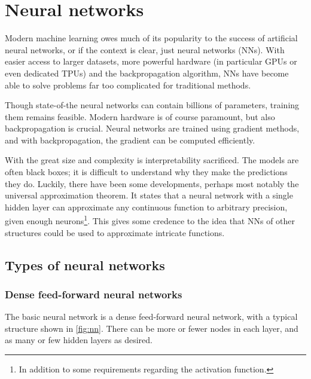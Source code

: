 \section{Neural networks}
Modern machine learning owes much of its popularity to the success of artificial neural networks, or if the context is clear, just neural networks (NNs).
With easier access to larger datasets, more powerful hardware (in particular GPUs or even dedicated TPUs) and the backpropagation algorithm, NNs have become able to solve problems far too complicated for traditional methods.

Though state-of-the neural networks can contain billions of parameters, training them remains feasible.
Modern hardware is of course paramount, but also backpropagation is crucial.
Neural networks are trained using gradient methods, and with backpropagation, the gradient can be computed efficiently.

With the great size and complexity is interpretability sacrificed.
The models are often black boxes; it is difficult to understand why they make the predictions they do.
Luckily, there have been some developments, perhaps most notably the universal approximation theorem.
It states that a neural network with a single hidden layer can approximate any continuous function to arbitrary precision, given enough neurons\footnote{In addition to some requirements regarding the activation function.}.
This gives some credence to the idea that NNs of other structures could be used to approximate intricate functions.


\subsection{Types of neural networks}
\subsubsection{Dense feed-forward neural networks}
The basic neural network is a dense feed-forward neural network, with a typical structure shown in \cref{fig:nn}.
There can be more or fewer nodes in each layer, and as many or few hidden layers as desired.

